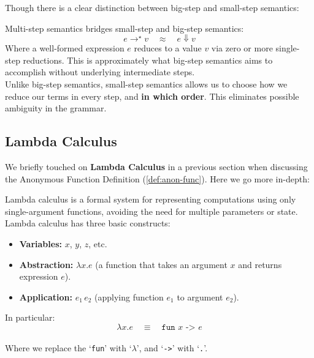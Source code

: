 \newpage 

\noindent
Though there is a clear distinction between big-step and small-step semantics:

\begin{theo}

    Multi-step semantics bridges small-step and big-step semantics:
    \Large
    \[
      e \rightarrow^\star v \quad \approx \quad e \Downarrow v
    \]
    \normalsize
    Where a well-formed expression \( e \) reduces to a value \( v \) via zero or more single-step reductions. This is approximately what big-step semantics aims to accomplish
    without underlying intermediate steps.\\
  
    \noindent
    Unlike big-step semantics, small-step semantics allows us to choose how we reduce our terms in every step, and \textbf{in which order}. This eliminates possible ambiguity in the grammar.
\end{theo}
  
\subsection{Lambda Calculus}

\noindent
We briefly touched on \textbf{Lambda Calculus} in a previous section when discussing the Anonymous Function Definition (\ref{def:anon-func}). Here
we go more in-depth:

\begin{Def}

    Lambda calculus is a formal system for representing computations using only single-argument functions, avoiding the need for multiple parameters or state. Lambda calculus has three basic constructs:
    \begin{itemize}
      \item \textbf{Variables:} \(x\), \(y\), \(z\), etc.
      \item \textbf{Abstraction:} \(\lambda x. e\) (a function that takes an argument \(x\) and returns expression \(e\)).
      \item \textbf{Application:} \(e_1\, e_2\) (applying function \(e_1\) to argument \(e_2\)).
    \end{itemize}
  
    \noindent
    In particular:
    \LARGE
    \[
        \lambda x. e \quad \equiv \quad \texttt{fun } x \texttt{ -> } e
    \]\\
    \normalsize
    \noindent
    Where we replace the `\texttt{fun}' with `$\lambda$', and `\texttt{->}' with `\texttt{.}'.
  \end{Def}
  
